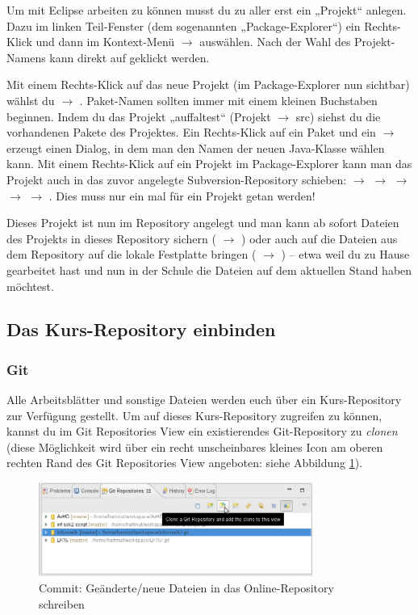 Um mit Eclipse arbeiten zu können musst du zu aller erst ein „Projekt“ anlegen.
Dazu im linken Teil-Fenster (dem sogenannten „Package-Explorer“) ein
Rechts-Klick und dann im Kontext-Menü  $\rightarrow$  auswählen. Nach der Wahl des Projekt-Namens kann direkt auf
 geklickt werden. 

Mit einem Rechts-Klick auf das neue Projekt (im Package-Explorer nun sichtbar)
wählst du  $\rightarrow$ . Paket-Namen sollten immer
mit einem kleinen Buchstaben beginnen. Indem du das Projekt „auffaltest“
(Projekt $\rightarrow$ src) siehst du die vorhandenen Pakete des Projektes. Ein
Rechts-Klick auf ein Paket und ein  $\rightarrow$ 
erzeugt einen Dialog, in dem man den Namen der neuen Java-Klasse wählen kann.
Mit einem Rechts-Klick auf ein Projekt im Package-Explorer kann man das Projekt
auch in das zuvor angelegte Subversion-Repository schieben: 
$\rightarrow$  $\rightarrow$ 
$\rightarrow$  $\rightarrow$  $\rightarrow$
. Dies muss nur ein mal für ein Projekt getan werden! 

Dieses Projekt ist nun im Repository angelegt und man kann ab sofort Dateien des
Projekts in dieses Repository sichern ( $\rightarrow$
) oder auch auf die Dateien aus dem Repository auf die
lokale Festplatte bringen ( $\rightarrow$ )
-- etwa weil du zu Hause gearbeitet hast und nun in der Schule die Dateien auf
dem aktuellen Stand haben möchtest.

\subsection{Das Kurs-Repository einbinden}

\subsubsection{Git}

Alle Arbeitsblätter und sonstige Dateien werden euch über ein Kurs-Repository
zur Verfügung gestellt. Um auf dieses Kurs-Repository zugreifen zu können,
kannst du im Git Repositories View ein existierendes Git-Repository zu
\emph{clonen} (diese Möglichkeit wird über ein recht unscheinbares kleines Icon
am oberen rechten Rand des Git Repositories View angeboten: siehe Abbildung
\ref{fig:git-clone}).

\begin{figure}[h]
  \centering
   \includegraphics[width=0.8\textwidth]{./inf/SEKII/01_Vorbereitung/Cloning_a_Git_Repository.png}
   \caption{Commit: Geänderte/neue Dateien in das Online-Repository schreiben}
   \label{fig:git-clone}
\end{figure}

